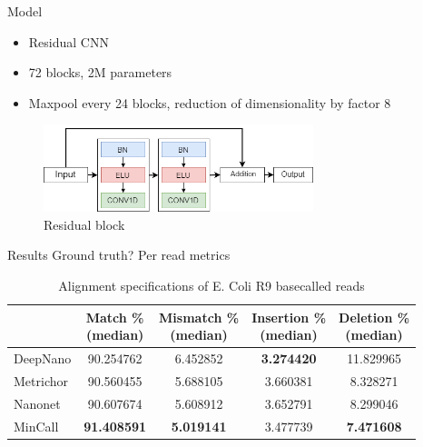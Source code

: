 \documentclass[10pt]{beamer}
\begin{document}
\begin{frame}[fragile]{Model}
	\begin{itemize}
		\item<1-> Residual CNN
		\item<2-> 72 blocks, 2M parameters
		\item<3-> Maxpool every 24 blocks, reduction of dimensionality by factor 8
	\end{itemize}
	 {
		\begin{figure}
			\caption{Residual block}
			\begin{center}
				\includegraphics[width=0.7\textwidth]{./imgs/model/block_small.png}%
	
			\end{center}
		\end{figure}
	}
\end{frame}



\begin{frame}[fragile]{Results}
	\alert{Ground truth?}
	Per read metrics

\begin{table}[htbp]
	\caption{Alignment specifications of E. Coli R9 basecalled reads}
	\label{tbl:ecoli_rates}
	\centering
	\begin{tabular}{lcccc}
		\toprule
		{} &  \thead{Match \% \\(median)} &  \thead{Mismatch \% \\(median)} &  \thead{Insertion \% \\(median)} &  \thead{Deletion \% \\(median)} \\
		\midrule
		DeepNano   &                  90.254762 &                      6.452852 &                       \textbf{3.274420} &                     11.829965 \\
		Metrichor  &                  90.560455 &                      5.688105 &                       3.660381 &                      8.328271 \\
		Nanonet    &                  90.607674 &                      5.608912 &                       3.652791 &                      8.299046 \\
		MinCall    &                  \textbf{91.408591} &                     \textbf{ 5.019141} &                       3.477739 &                      \textbf{7.471608 }\\
		\bottomrule
	\end{tabular}
\end{table}
	
\end{frame}
\end{document}
